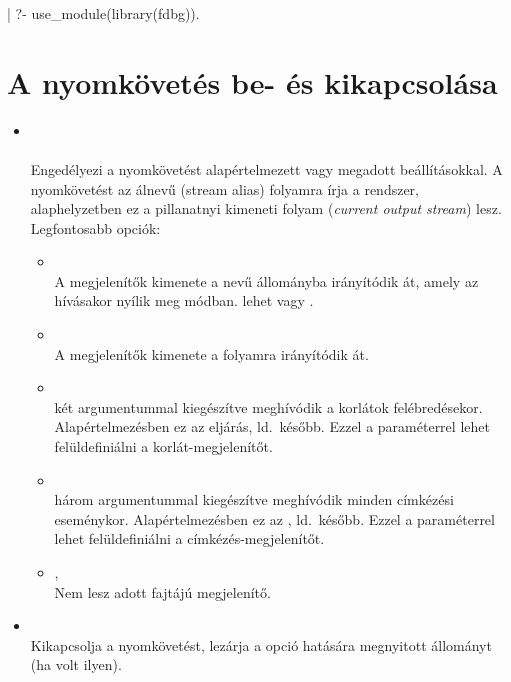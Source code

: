 \begin{prologcode}
| ?- use_module(library(fdbg)).
\end{prologcode}

\section{A nyomkövetés be- és kikapcsolása}

\begin{itemize}
\item {}\\ \\
Engedélyezi a nyomkövetést alapértelmezett vagy megadott beállításokkal. A
nyomkövetést az  álnevű (stream alias) folyamra írja a
rendszer, alaphelyzetben ez a pillanatnyi kimeneti folyam ({\em current
output stream}) lesz. Legfontosabb opciók:\\
\begin{itemize}
\item {}\\
  A megjelenítők kimenete a  nevű állományba irányítódik
  át, amely az  hívásakor nyílik meg  módban.
   lehet  vagy .
\item {}\\
  A megjelenítők kimenete a  folyamra irányítódik át.
\item {}\\
   két argumentummal kiegészítve meghívódik a korlátok
  felébredésekor. Alapértelmezésben ez az  eljárás, ld.~később.
  Ezzel a paraméterrel lehet felüldefiniálni a korlát-megjelenítőt.
\item {}\\
   három argumentummal kiegészítve meghívódik minden címkézési
  eseménykor. Alapértelmezésben ez az , ld.~később.
  Ezzel a paraméterrel lehet felüldefiniálni a címkézés-megjelenítőt.
\item {}, \\ 
  Nem lesz adott fajtájú megjelenítő.
\end{itemize}

\item {}\\
  Kikapcsolja a nyomkövetést, lezárja a  opció hatására megnyitott
  állományt (ha volt ilyen).
\end{itemize}


